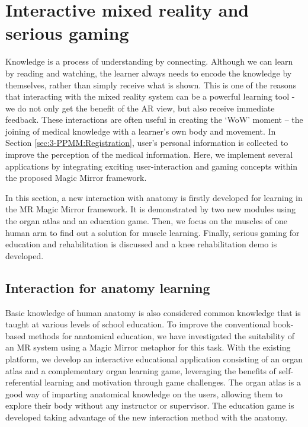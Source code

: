 
\section{Interactive mixed reality and serious gaming} \label{sec:3-PPMM:IMR}
Knowledge is a process of understanding by connecting. Although we can learn by reading and watching, the learner always needs to encode the knowledge by themselves, rather than simply receive what is shown. This is one of the reasons that interacting with the mixed reality system can be a powerful learning tool - we do not only get the benefit of the AR view, but also receive immediate feedback. These interactions are often useful in creating the `WoW' moment -- the joining of medical knowledge with a learner's own body and movement.
In Section \ref{sec:3-PPMM:Registration}, user's personal information is collected to improve the perception of the medical information.
Here, we implement several applications by integrating exciting user-interaction and gaming concepts within the proposed Magic Mirror framework.
 
In this section, a new interaction with anatomy is firstly developed for learning in the MR Magic Mirror framework. It is demonstrated by two new modules using the organ atlas and an education game.
Then, we focus on the muscles of one human arm to find out a solution for muscle learning. 
Finally, serious gaming for education and rehabilitation is discussed and a knee rehabilitation demo is developed. 

\subsection{Interaction for anatomy learning} \label{sec:3-IMR:anatomyLearning}
Basic knowledge of human anatomy is also considered common knowledge that is taught at various levels of school education. To improve the conventional book-based methods for anatomical education, we have investigated the suitability of an MR system using a Magic Mirror metaphor for this task.
With the existing platform, we develop an interactive educational application consisting of an organ atlas and a complementary organ learning game, leveraging the benefits of self-referential learning and motivation through game challenges.
The organ atlas is a good way of imparting anatomical knowledge on the users, allowing them to explore their body without any instructor or supervisor.  The education game is developed taking advantage of the new interaction method with the anatomy. 

